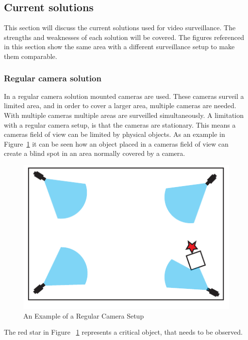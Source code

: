 \subsection{Current solutions}
This section will discuss the current solutions used for video surveillance.
The strengths and weaknesses of each solution will be covered.
The figures referenced in this section show the same area with a different surveillance setup to make them comparable.
\subsubsection{Regular camera solution}
In a regular camera solution mounted cameras are used.
These cameras surveil a limited area, and in order to cover a larger area, multiple cameras are needed.
With multiple cameras multiple areas are surveilled simultaneously.
A limitation with a regular camera setup, is that the cameras are stationary.
This means a cameras field of view can be limited by physical objects.
As an example in Figure~\ref{fig:refular_camera_setup} it can be seen how an object placed in a cameras field of view can create a blind spot in an area normally covered by a camera.
\begin{figure}[htb]
    \centering
    \includegraphics[width=\textwidth]{gfx/regular_camera_setup.pdf}
    \caption{An Example of a Regular Camera Setup}
    \label{fig:refular_camera_setup}
\end{figure}
The red star in Figure ~\ref{fig:refular_camera_setup} represents a critical object, that needs to be observed.

